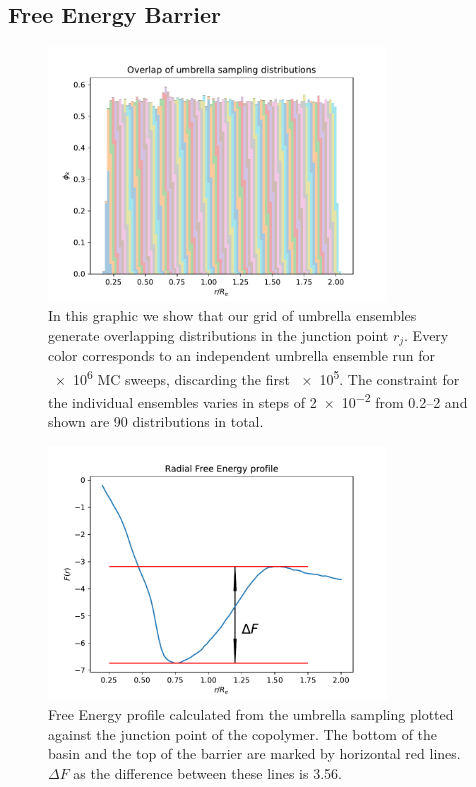 \documentclass[../main.tex]{subfiles}
\begin{document}
\subsection{Free Energy Barrier}

\begin{figure}[htpb]
    \centering
    \includegraphics[width=0.8\textwidth]{../figures/ex1_overlap_umbrella.pdf}
    \caption{
        In this graphic we show that our grid of umbrella ensembles generate overlapping distributions in the junction point $r_j$.
        Every color corresponds to an independent umbrella ensemble run for \num{e6} MC sweeps, discarding the first \num{e5}.
        The constraint for the individual ensembles varies in steps of \SI{2e-2}{\charlength} from \qtyrange{.2}{2}{\charlength} and shown are \num{90} distributions in total.
    }
    \label{fig:ex1_overlap_umbrella}
\end{figure}

\begin{figure}[htpb]
    \centering
    \includegraphics[width=0.8\textwidth]{../figures/ex1_free_energy_profile.pdf}
    \caption{
        Free Energy profile calculated from the umbrella sampling plotted against the junction point of the copolymer.
        The bottom of the basin and the top of the barrier are marked by horizontal red lines.
        $\Delta F$ as the difference between these lines is \SI{3.56}{\charenergy}.
    }
    \label{fig:ex1_free_energy_profile}
\end{figure}
\end{document}
